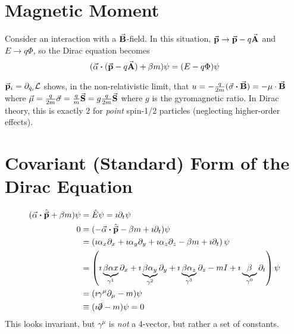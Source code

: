 \documentclass[a4paper,twoside,master.tex]{subfiles}
\begin{document}

\section{Magnetic Moment}\label{sec:magnetic_moment}

Consider an interaction with a $ \va{B} $-field. In this situation, $ \va{p} \to \va{p} - q \va{A} $ and $ E \to q \Phi $, so the Dirac equation becomes
\begin{equation}
    (\va{\alpha} \vdot (\va{p} - q \va{A}) + \beta m) \psi = (E - q \Phi) \psi 
\end{equation}

$ \va{p}_i = \partial_{\dot{q}_i} \mathcal{L} $ shows, in the non-relativistic limit, that $ u = - \frac{q}{2m} (\va{\sigma} \vdot \va{B}) = - \mu \cdot \va{B} $ where $ \va{\mu} = \frac{q}{2m} \va{\sigma} = \frac{q}{m} \va{S} = g \frac{q}{2m} \va{S} $ where $ g $ is the gyromagnetic ratio. In Dirac theory, this is exactly $ 2 $ for \textit{point} spin-1/2 particles (neglecting higher-order effects).


\section{Covariant (Standard) Form of the Dirac Equation}\label{sec:covariant_(standard)_form_of_the_dirac_equation}

\begin{align}
    (\va{\alpha} \vdot \hat{\va{p}} + \beta m) \psi &= \hat{E} \psi = \imath \partial_t \psi \\
    0 &= (- \va{\alpha} \vdot \hat{\va{p}} - \beta m + \imath \partial_t) \psi \\
    &= \left( \imath \alpha_x \partial_x + \imath \alpha_y \partial_y + \imath \alpha_z \partial_z - \beta m + \imath \partial_t \right) \psi \\
    &= \left( \imath \underbrace{\beta \alpha x}_{\gamma^1} \partial_x + \imath \underbrace{\beta \alpha_y}_{\gamma^2} \partial_y + \imath \underbrace{\beta \alpha_z}_{\gamma^3} \partial_z - m I + \imath \underbrace{\beta}_{\gamma^0} \partial_t\right) \psi \\
    &= (\imath \gamma^{\mu} \partial_{\mu} - m) \psi \\
    &\equiv (\imath \slashed{\partial} - m) \psi = 0
\end{align}
This looks invariant, but $ \gamma^{\mu} $ is \textit{not} a 4-vector, but rather a set of constants.
\end{document}
